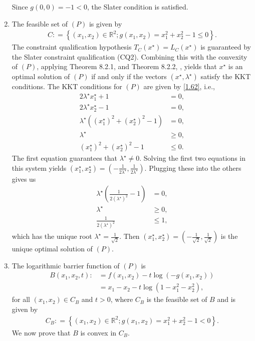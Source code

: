 \documentclass[a4paper]{article}
\numberwithin{equation}{section}
\begin{document}
\begin{enumerate}
Since $g\left(0,0\right)=-1<0$, the Slater condition is satisfied.
\item The feasible set of $\left(P\right)$ is given by
\begin{align}
C: = \left\{ {\left( {{x_1},{x_2}} \right) \in {\mathbb{R}^2};g\left( {{x_1},{x_2}} \right) = x_1^2 + x_2^2 - 1 \le 0} \right\}.
\end{align}
The constraint qualification hypothesis $T_C\left(x^\star\right)=L_C\left(x^\star\right)$ is guaranteed by the Slater constraint qualification (CQ2). Combining this with the convexity of $\left(P\right)$, applying Theorem 8.2.1, and Theorem 8.2.2, \cite{2}, yields that $x^\star$ is an optimal solution of $\left(P\right)$ if and only if the vectors $\left(x^\star,\lambda ^\star\right)$ satisfy the KKT conditions. The KKT conditions for $\left(P\right)$ are given by \eqref{1.62}, i.e.,
\begin{align}
2{\lambda ^\star}x_1^\star + 1 &= 0,\\
2{\lambda ^\star}x_2^\star - 1 &= 0,\\
{\lambda ^\star}\left( {{{\left( {x_1^\star} \right)}^2} + {{\left( {x_2^\star} \right)}^2} - 1} \right) &= 0,\\
{\lambda ^\star} &\ge 0,\\
{\left( {x_1^\star} \right)^2} + {\left( {x_2^\star} \right)^2} - 1 &\le 0.
\end{align}
The first equation guarantees that $\lambda ^\star \ne 0$. Solving the first two equations in this system yields $\left( {x_1^\star,x_2^\star} \right) = \left( { - \frac{1}{{2{\lambda ^\star}}},\frac{1}{{2{\lambda ^\star}}}} \right)$. Plugging these into the others gives us
\begin{align}
{\lambda ^\star}\left( {\frac{1}{{2{{\left( {{\lambda ^\star}} \right)}^2}}} - 1} \right) &= 0,\\
{\lambda ^\star} &\ge 0,\\
\frac{1}{{2{{\left( {{\lambda ^\star}} \right)}^2}}} &\le 1 ,
\end{align}
which has the unique root ${\lambda ^\star} = \frac{1}{{\sqrt 2 }}$. Then $\left( {x_1^\star,x_2^\star} \right) = \left( { - \frac{1}{{\sqrt 2 }},\frac{1}{{\sqrt 2 }}} \right)$ is the unique optimal solution of $\left(P\right)$.
\item The logarithmic barrier function of $\left(P\right)$ is
\begin{align}
B\left( {{x_1},{x_2},t} \right): &= f\left( {{x_1},{x_2}} \right) - t\log \left( { - g\left( {{x_1},{x_2}} \right)} \right)\\
 &= {x_1} - {x_2} - t\log \left( {1 - x_1^2 - x_2^2} \right),
\end{align} 
for all $\left(x_1,x_2\right)\in C_B$ and $t>0$, where $C_B$ is the feasible set of $B$ and is given by
\begin{align}
{C_B}: = \left\{ {\left( {{x_1},{x_2}} \right) \in {\mathbb{R}^2};g\left( {{x_1},{x_2}} \right) = x_1^2 + x_2^2 - 1 < 0} \right\}.
\end{align}
We now prove that $B$ is convex in $C_B$.


\end{enumerate}
\end{document}
